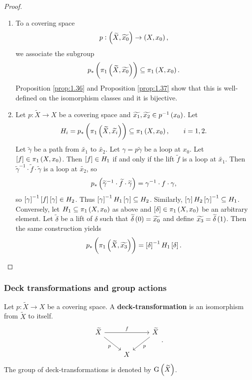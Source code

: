\begin{proof}
\hfill
\begin{enumerate}
\item To a covering space
$$ p : \br{\widetilde{X}, \widetilde{x_0}} \to \br{X, x_0}, $$
we associate the subgroup
$$ p_*\br{\pi_1\br{\widetilde{X}, \widetilde{x_0}}} \subseteq \pi_1\br{X, x_0}. $$
Proposition \ref{prop:1.36} and Proposition \ref{prop:1.37} show that this is well-defined on the isomorphism classes and it is bijective.

\pagebreak

\item Let $ p : \widetilde{X} \to X $ be a covering space and $ \widetilde{x_1}, \widetilde{x_2} \in p^{-1}\br{x_0} $. Let
$$ H_i = p_*\br{\pi_1\br{\widetilde{X}, \widetilde{x_i}}} \subseteq \pi_1\br{X, x_0}, \qquad i = 1, 2. $$
Let $ \widetilde{\gamma} $ be a path from $ \widetilde{x_1} $ to $ \widetilde{x_2} $. Let $ \gamma = p\widetilde{\gamma} $ be a loop at $ x_0 $. Let $ \sbr{f} \in \pi_1\br{X, x_0} $. Then $ \sbr{f} \in H_1 $ if and only if the lift $ \widetilde{f} $ is a loop at $ \widetilde{x_1} $. Then $ \widetilde{\gamma}^{-1} \cdot \widetilde{f} \cdot \widetilde{\gamma} $ is a loop at $ \widetilde{x_2} $, so
$$ p_*\br{\widetilde{\gamma}^{-1} \cdot \widetilde{f} \cdot \widetilde{\gamma}} = \gamma^{-1} \cdot f \cdot \gamma, $$
so $ \sbr{\gamma}^{-1}\sbr{f}\sbr{\gamma} \in H_2 $. Thus $ \sbr{\gamma}^{-1}H_1\sbr{\gamma} \subseteq H_2 $. Similarly, $ \sbr{\gamma}H_2\sbr{\gamma}^{-1} \subseteq H_1 $. Conversely, let $ H_1 \subseteq \pi_1\br{X, x_0} $ as above and $ \sbr{\delta} \in \pi_1\br{X, x_0} $ be an arbitrary element. Let $ \widetilde{\delta} $ be a lift of $ \delta $ such that $ \widetilde{\delta}\br{0} = \widetilde{x_0} $ and define $ \widetilde{x_3} = \widetilde{\delta}\br{1} $. Then the same construction yields
$$ p_*\br{\pi_1\br{\widetilde{X}, \widetilde{x_3}}} = \sbr{\delta}^{-1}H_1\sbr{\delta}. $$
\end{enumerate}
\end{proof}

\subsubsection{Deck transformations and group actions}

\begin{definition*}
Let $ p : \widetilde{X} \to X $ be a covering space. A \textbf{deck-transformation} is an isomorphism from $ \widetilde{X} $ to itself.
$$
\begin{tikzcd}
\widetilde{X} \arrow{rr}{f} \arrow[swap]{dr}{p} & & \widetilde{X} \arrow{dl}{p} \\
& X &
\end{tikzcd}.
$$
The group of deck-transformations is denoted by $ \G\br{\widetilde{X}} $.
\end{definition*}

